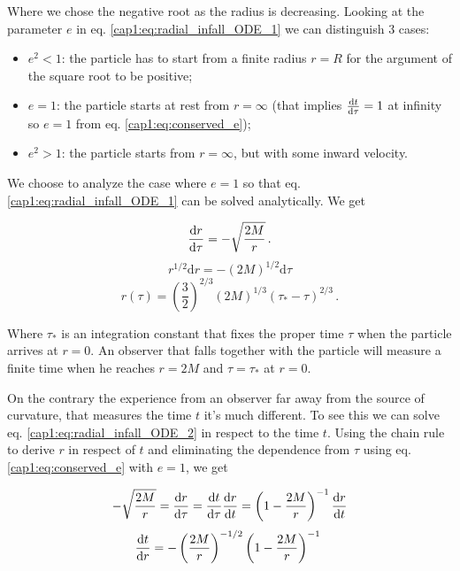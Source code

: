 Where we chose the negative root as the radius is decreasing.
Looking at the parameter $e$ in eq. \ref{cap1:eq:radial_infall_ODE_1} we can
distinguish 3 cases:
\begin{itemize}
    \item{$e^2 < 1$:} the particle has to start from a finite radius $r = R$
        for the argument of the square root to be positive;
    \item{$e = 1$:} the particle starts at rest from $r = \infty$ (that implies
        $\dv{t}{\tau} = 1$ at infinity so $e = 1$ from eq. \ref{cap1:eq:conserved_e});
    \item{$e^2 > 1$:} the particle starts from $r = \infty$, but with some inward
        velocity.
\end{itemize}
We choose to analyze the case where $e = 1$ so that eq.
\ref{cap1:eq:radial_infall_ODE_1} can be solved analytically.
We get

\begin{equation}
    \dv{r}{\tau} = - \sqrt{\frac{2 M}{r}} \, .
    \label{cap1:eq:radial_infall_ODE_2}
\end{equation}
\begin{equation*}
    r^{1/2} \mathrm{d}r = -(2M)^{1/2} \mathrm{d}\tau
\end{equation*}
\begin{equation}
    r(\tau) = \left(\frac{3}{2}\right)^{2/3}
    (2M)^{1/3} (\tau_* - \tau)^{2/3} \, .
    \label{cap1:eq:radial_infall_r_of_tau}
\end{equation}

Where $\tau_*$ is an integration constant that fixes the proper time $\tau$
when the particle arrives at $r = 0$.
An observer that falls together with the particle will measure a finite time
when he reaches $r = 2M$ and $\tau = \tau_*$ at $r = 0$.

On the contrary the experience from an observer far away from the source of
curvature, that measures the \Sh time $t$ it's much different.
To see this we can solve eq. \ref{cap1:eq:radial_infall_ODE_2} in respect to
the \Sh time $t$.
Using the chain rule to derive $r$ in respect of $t$ and eliminating the
dependence from $\tau$ using eq. \ref{cap1:eq:conserved_e} with $e = 1$, we get

\begin{align*}
    - \sqrt{\frac{2 M}{r}} = \dv{r}{\tau} = \dv{t}{\tau} \dv{r}{t}
    = \left(1 - \frac{2M}{r} \right)^{-1} \dv{r}{t}
\end{align*}
\begin{equation*}
    \dv{t}{r} = - \left(\frac{2 M}{r}\right)^{-1/2}
    \left(1 - \frac{2M}{r} \right)^{-1} \,  \, 
\end{equation*}

